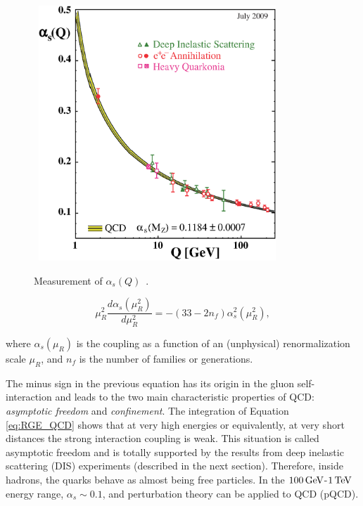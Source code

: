 \begin{figure}[!ht]
  \begin{center}
    \mbox{
        \includegraphics[width=0.795\textwidth]{StandardModel/Figures/asq-2009.eps}
    }
  \end{center}
  \caption[Measurement of $\alpha_s(Q)$~\cite{Bethke:2009jm}.]{Measurement of $\alpha_s(Q)$~\cite{Bethke:2009jm}.}
  \label{fig:alphaRunning}
\end{figure}

\begin{equation}
\mu_{R}^{2} \frac{d\alpha_s(\mu_{R}^{2})}{d\mu_{R}^{2}} = -(33 - 2n_{f})\alpha_{s}^{2}(\mu_{R}^{2}),
\label{eq:RGE_QCD}
\end{equation}

\noindent where $\alpha_{s}(\mu_R)$ is the coupling as a function of an (unphysical) renormalization scale $\mu_R$, and $n_f$ is the number of families or generations.

The minus sign in the previous equation has its origin in the gluon self-interaction and leads to the two main characteristic properties of QCD: \emph{asymptotic freedom} and \emph{confinement}.
The integration of Equation \ref{eq:RGE_QCD} shows that at very high energies or equivalently, at very short distances the strong interaction coupling is weak.
This situation is called asymptotic freedom and is totally supported by the results from deep inelastic scattering (DIS) experiments (described in the next section).
Therefore, inside hadrons, the quarks behave as almost being free particles. 
In the $\unit[100]{GeV}$-$\unit[1]{TeV}$ energy range, $\alpha_s\sim 0.1$, and perturbation theory can be applied to QCD (pQCD).


